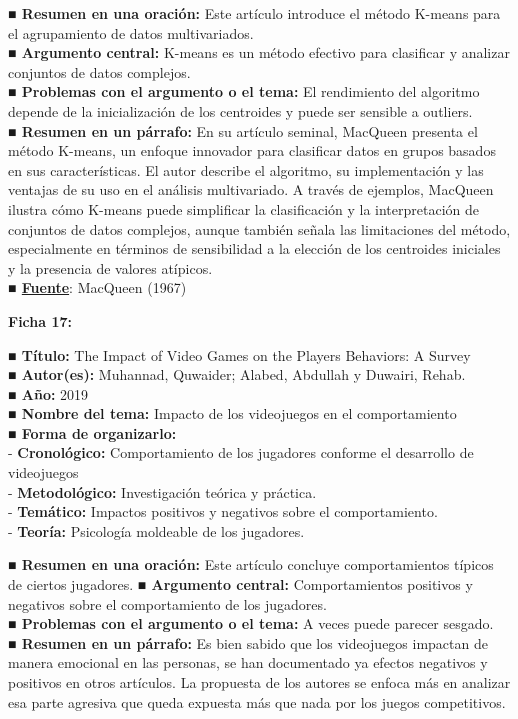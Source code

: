 \documentclass[
  letterpaper,
  DIV=11,
  numbers=noendperiod]{scrreprt}
\begin{document}
\textbf{■ Resumen en una oración:} Este artículo introduce el método
K-means para el agrupamiento de datos multivariados.\\
\textbf{■ Argumento central:} K-means es un método efectivo para
clasificar y analizar conjuntos de datos complejos.\\
\textbf{■ Problemas con el argumento o el tema:} El rendimiento del
algoritmo depende de la inicialización de los centroides y puede ser
sensible a outliers.\\
\textbf{■ Resumen en un párrafo:} En su artículo seminal, MacQueen
presenta el método K-means, un enfoque innovador para clasificar datos
en grupos basados en sus características. El autor describe el
algoritmo, su implementación y las ventajas de su uso en el análisis
multivariado. A través de ejemplos, MacQueen ilustra cómo K-means puede
simplificar la clasificación y la interpretación de conjuntos de datos
complejos, aunque también señala las limitaciones del método,
especialmente en términos de sensibilidad a la elección de los
centroides iniciales y la presencia de valores atípicos.\\
\textbf{■
\href{https://projecteuclid.org/euclid.bsmsp/1200512992}{Fuente}}:
MacQueen (1967)

\textbf{Ficha 17:}

\textbf{■ Título:} The Impact of Video Games on the Players Behaviors: A
Survey\\
\textbf{■ Autor(es):} Muhannad, Quwaider; Alabed, Abdullah y Duwairi,
Rehab.\\
\textbf{■ Año:} 2019\\
\textbf{■ Nombre del tema:} Impacto de los videojuegos en el
comportamiento\\
\textbf{■ Forma de organizarlo:}\\
- \textbf{Cronológico:} Comportamiento de los jugadores conforme el
desarrollo de videojuegos\\
- \textbf{Metodológico:} Investigación teórica y práctica.\\
- \textbf{Temático:} Impactos positivos y negativos sobre el
comportamiento.\\
- \textbf{Teoría:} Psicología moldeable de los jugadores.

\textbf{■ Resumen en una oración:} Este artículo concluye
comportamientos típicos de ciertos jugadores. \textbf{■ Argumento
central:} Comportamientos positivos y negativos sobre el comportamiento
de los jugadores.\\
\textbf{■ Problemas con el argumento o el tema:} A veces puede parecer
sesgado.\\
\textbf{■ Resumen en un párrafo:} Es bien sabido que los videojuegos
impactan de manera emocional en las personas, se han documentado ya
efectos negativos y positivos en otros artículos. La propuesta de los
autores se enfoca más en analizar esa parte agresiva que queda expuesta
más que nada por los juegos competitivos.
\end{document}
